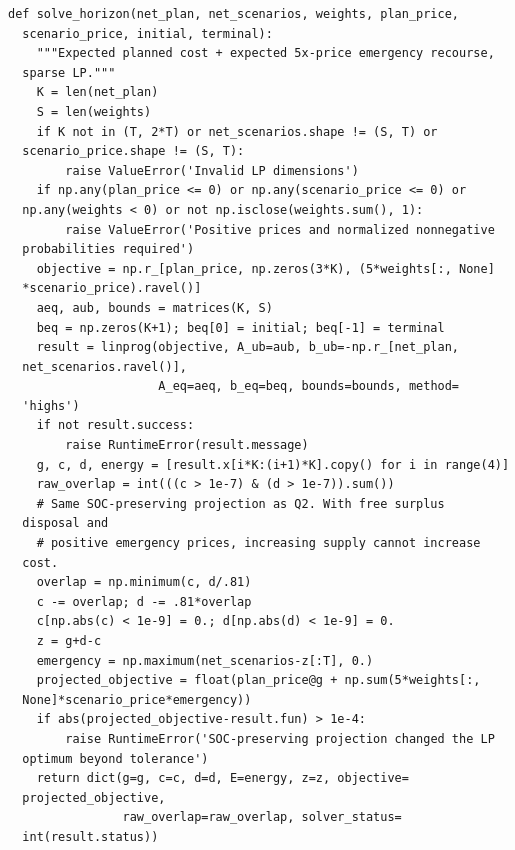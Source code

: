 \begin{verbatim}
def solve_horizon(net_plan, net_scenarios, weights, plan_price,
  scenario_price, initial, terminal):
    """Expected planned cost + expected 5x-price emergency recourse,
  sparse LP."""
    K = len(net_plan)
    S = len(weights)
    if K not in (T, 2*T) or net_scenarios.shape != (S, T) or
  scenario_price.shape != (S, T):
        raise ValueError('Invalid LP dimensions')
    if np.any(plan_price <= 0) or np.any(scenario_price <= 0) or
  np.any(weights < 0) or not np.isclose(weights.sum(), 1):
        raise ValueError('Positive prices and normalized nonnegative
  probabilities required')
    objective = np.r_[plan_price, np.zeros(3*K), (5*weights[:, None]
  *scenario_price).ravel()]
    aeq, aub, bounds = matrices(K, S)
    beq = np.zeros(K+1); beq[0] = initial; beq[-1] = terminal
    result = linprog(objective, A_ub=aub, b_ub=-np.r_[net_plan,
  net_scenarios.ravel()],
                     A_eq=aeq, b_eq=beq, bounds=bounds, method=
  'highs')
    if not result.success:
        raise RuntimeError(result.message)
    g, c, d, energy = [result.x[i*K:(i+1)*K].copy() for i in range(4)]
    raw_overlap = int(((c > 1e-7) & (d > 1e-7)).sum())
    # Same SOC-preserving projection as Q2. With free surplus
  disposal and
    # positive emergency prices, increasing supply cannot increase
  cost.
    overlap = np.minimum(c, d/.81)
    c -= overlap; d -= .81*overlap
    c[np.abs(c) < 1e-9] = 0.; d[np.abs(d) < 1e-9] = 0.
    z = g+d-c
    emergency = np.maximum(net_scenarios-z[:T], 0.)
    projected_objective = float(plan_price@g + np.sum(5*weights[:,
  None]*scenario_price*emergency))
    if abs(projected_objective-result.fun) > 1e-4:
        raise RuntimeError('SOC-preserving projection changed the LP
  optimum beyond tolerance')
    return dict(g=g, c=c, d=d, E=energy, z=z, objective=
  projected_objective,
                raw_overlap=raw_overlap, solver_status=
  int(result.status))
\end{verbatim}

